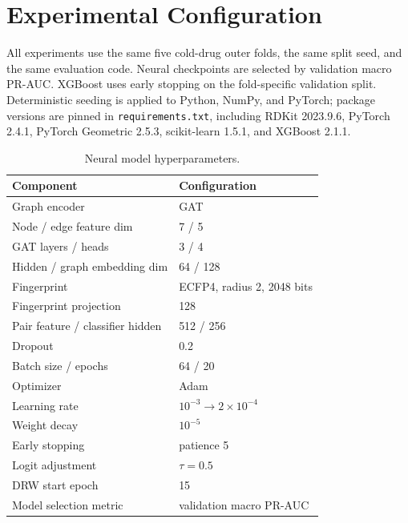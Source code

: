 \section{Experimental Configuration}
All experiments use the same five cold-drug outer folds, the same split seed, and the same evaluation code. Neural checkpoints are selected by validation macro PR-AUC. XGBoost uses early stopping on the fold-specific validation split. Deterministic seeding is applied to Python, NumPy, and PyTorch; package versions are pinned in \texttt{requirements.txt}, including RDKit 2023.9.6, PyTorch 2.4.1, PyTorch Geometric 2.5.3, scikit-learn 1.5.1, and XGBoost 2.1.1.

\begin{table}[H]
\centering
\caption{Neural model hyperparameters.}
\label{tab:neural_hyperparams}
\begin{tabular}{ll}
\toprule
Component & Configuration \\
\midrule
Graph encoder & GAT \\
Node / edge feature dim & 7 / 5 \\
GAT layers / heads & 3 / 4 \\
Hidden / graph embedding dim & 64 / 128 \\
Fingerprint & ECFP4, radius 2, 2048 bits \\
Fingerprint projection & 128 \\
Pair feature / classifier hidden & 512 / 256 \\
Dropout & 0.2 \\
Batch size / epochs & 64 / 20 \\
Optimizer & Adam \\
Learning rate & \(10^{-3}\rightarrow 2\times10^{-4}\) \\
Weight decay & \(10^{-5}\) \\
Early stopping & patience 5 \\
Logit adjustment & \(\tau=0.5\) \\
DRW start epoch & 15 \\
Model selection metric & validation macro PR-AUC \\
\bottomrule
\end{tabular}
\end{table}

